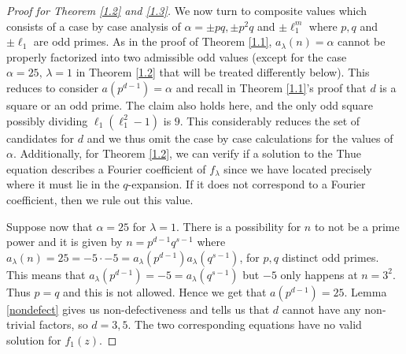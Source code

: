 \documentclass[12pt]{amsart}
\numberwithin{equation}{section}
\begin{document}
\begin{proof}[Proof for Theorem \ref{1.2} and \ref{1.3}]
We now turn to composite values which consists of a case by case analysis of $\alpha=\pm pq,\pm p^2q$ and $\pm\ell_1^m$ where $p,q$ and $\pm \ell_1$ are odd primes. As in the proof of Theorem \ref{1.1}, $a_\lambda(n)=\alpha$ cannot be properly factorized into two admissible odd values (except for the case $\alpha=25,\,\lambda=1$ in Theorem \ref{1.2} that will be treated differently below). This reduces to consider $a(p^{d-1})=\alpha$ and recall in Theorem \ref{1.1}'s proof that $d$ is a square or an odd prime. The claim also holds here, and the only odd square possibly dividing $\ell_1(\ell_1^2-1)$ is $9$. This considerably reduces the set of candidates for $d$ and we thus omit the case by case calculations for the values of $\alpha$. Additionally, for Theorem \ref{1.2}, we can verify \cite{LMFDB} if a solution to the Thue equation describes a Fourier coefficient of $f_\lambda$ since we have located precisely where it must lie in the $q$-expansion. If it does not correspond to a Fourier coefficient, then we rule out this value.

Suppose now that $\alpha=25$ for $\lambda=1$. There is a possibility for $n$ to not be a prime power and it is given by $n=p^{d-1}q^{s-1}$ where $a_\lambda(n)=25=-5\cdot -5=a_\lambda(p^{d-1})a_\lambda(q^{s-1})$, for $p,q$ distinct odd primes. This means that $a_\lambda(p^{d-1})=-5=a_\lambda(q^{s-1})$ but $-5$ only happens at $n=3^2$. Thus $p=q$ and this is not allowed. Hence we get that $a(p^{d-1})=25$. Lemma \ref{nondefect} gives us non-defectiveness and tells us that $d$ cannot have any non-trivial factors, so $d=3, 5$. The two corresponding equations have no valid solution for $f_1(z)$. 
\end{proof}
\vspace{4mm}
\end{document}
